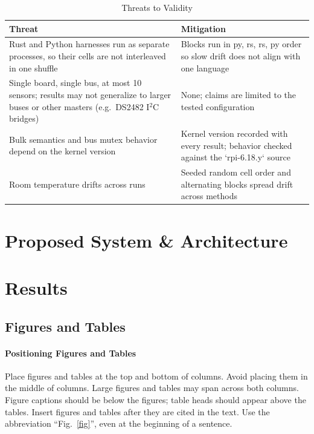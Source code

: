 \documentclass[conference]{IEEEtran}
\begin{document}
\begin{table}[!ht]
\caption{Threats to Validity}
\begin{center}
\footnotesize
\begin{tabular}{|p{3.9cm}|p{3.9cm}|}
\hline
\textbf{Threat} & \textbf{Mitigation} \\
\hline
Rust and Python harnesses run as separate processes, so their cells are not interleaved in one shuffle & Blocks run in py, rs, rs, py order so slow drift does not align with one language \\
\hline
Single board, single bus, at most 10 sensors; results may not generalize to larger buses or other masters (e.g.\ DS2482 I$^2$C bridges) & None; claims are limited to the tested configuration \\
\hline
Bulk semantics and bus mutex behavior depend on the kernel version & Kernel version recorded with every result; behavior checked against the `rpi-6.18.y` source \\
\hline
Room temperature drifts across runs & Seeded random cell order and alternating blocks spread drift across methods \\
\hline
\end{tabular}
\label{tab:threats}
\end{center}
\end{table}

\section{Proposed System \& Architecture}

\section{Results}


\subsection{Figures and Tables}\label{FAT}
\paragraph{Positioning Figures and Tables} Place figures and tables at the top and 
bottom of columns.
Avoid placing them in the middle of columns.
Large 
figures and tables may span across both columns.
Figure captions should be 
below the figures; table heads should appear above the tables.
Insert 
figures and tables after they are cited in the text.
Use the abbreviation 
``Fig.~\ref{fig}'', even at the beginning of a sentence.
\end{document}
